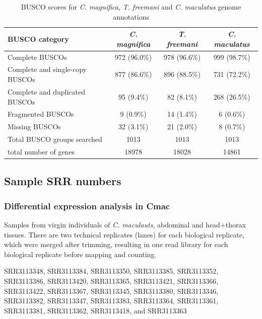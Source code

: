 \documentclass{article}
\begin{document}
\begin{table}[H]
    \centering
    \caption{BUSCO scores for \textit{C. magnifica}, \textit{T. freemani} and \textit{C. maculatus} genome annotations}
    \label{SItab:BUSCO}
    \begin{tabular}{l |c |c | c}
        BUSCO category & \textit{C. magnifica} &  \textit{T. freemani} & \textit{C. maculatus} \\
        \hline
        \hline	   
        Complete BUSCOs & 972 (96.0\%) & 978 (96.6\%) & 999 (98.7\%) \\
        \hline
        Complete and single-copy BUSCOs & 877 (86.6\%) & 896 (88.5\%) & 731 (72.2\%) \\
        \hline
        Complete and duplicated BUSCOs & 95	(9.4\%) & 82 (8.1\%) & 268 (26.5\%) \\
        \hline
        Fragmented BUSCOs & 9 (0.9\%) & 14 (1.4\%) & 6 (0.6\%) \\
        \hline
        Missing BUSCOs & 32	(3.1\%) & 21 (2.0\%) & 8 (0.7\%) \\
        \hline
        Total BUSCO groups searched & 1013	 & 1013 & 1013 \\
        \hline
        \hline
        total number of genes & 18978 & 18028 & 14861 \\
    \end{tabular}
\end{table}

\subsection*{Sample SRR numbers}

\subsubsection*{Differential expression analysis in Cmac}

Samples from virgin individuals of \textit{C. maculauts}, abdominal and head+thorax tissues. There are two technical replicates (lanes) for each biological replicate, which were merged after trimming, resulting in one read library for each biological replicate before mapping and counting.

SRR3113348, SRR3113384, SRR3113350, SRR3113385, SRR3113352, SRR3113386, SRR3113420, SRR3113365, SRR3113421, SRR3113366, SRR3113422, SRR3113367, SRR3113345, SRR3113380, SRR3113346, SRR3113382, SRR3113347, SRR3113383, SRR3113364, SRR3113361, SRR3113381, SRR3113362, SRR3113418, and SRR3113363
\end{document}
